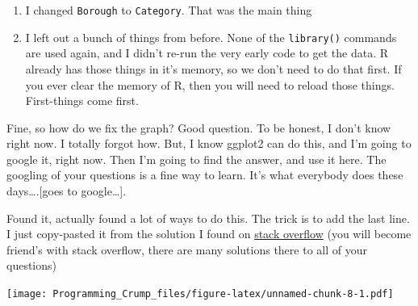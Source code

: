 \documentclass[]{book}
\newenvironment{Shaded}{\begin{snugshade}}{\end{snugshade}}
\newcommand{\KeywordTok}[1]{\textcolor[rgb]{0.13,0.29,0.53}{\textbf{{#1}}}}
\newcommand{\DataTypeTok}[1]{\textcolor[rgb]{0.13,0.29,0.53}{{#1}}}
\newcommand{\DecValTok}[1]{\textcolor[rgb]{0.00,0.00,0.81}{{#1}}}
\newcommand{\StringTok}[1]{\textcolor[rgb]{0.31,0.60,0.02}{{#1}}}
\newcommand{\NormalTok}[1]{{#1}}
\theoremstyle{definition}
\theoremstyle{definition}
\theoremstyle{definition}
\theoremstyle{remark}
\begin{document}
\begin{enumerate}
\def\labelenumi{\arabic{enumi}.}
\item
  I changed \texttt{Borough} to \texttt{Category}. That was the main
  thing
\item
  I left out a bunch of things from before. None of the
  \texttt{library()} commands are used again, and I didn't re-run the
  very early code to get the data. R already has those things in it's
  memory, so we don't need to do that first. If you ever clear the
  memory of R, then you will need to reload those things. First-things
  come first.
\end{enumerate}

Fine, so how do we fix the graph? Good question. To be honest, I don't
know right now. I totally forgot how. But, I know ggplot2 can do this,
and I'm going to google it, right now. Then I'm going to find the
answer, and use it here. The googling of your questions is a fine way to
learn. It's what everybody does these days\ldots{}.{[}goes to
google\ldots{}{]}.

Found it, actually found a lot of ways to do this. The trick is to add
the last line. I just copy-pasted it from the solution I found on
\href{https://stackoverflow.com/questions/1330989/rotating-and-spacing-axis-labels-in-ggplot2}{stack
overflow} (you will become friend's with stack overflow, there are many
solutions there to all of your questions)

\begin{Shaded}
\end{Shaded}

\texttt{[image: Programming\_Crump\_files/figure-latex/unnamed-chunk-8-1.pdf]}
\end{document}
